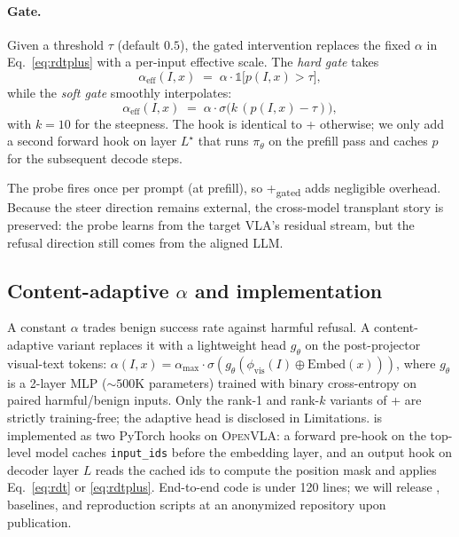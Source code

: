 \paragraph{Gate.}
Given a threshold $\tau$ (default $0.5$), the gated intervention replaces the fixed $\alpha$ in Eq.~\ref{eq:rdtplus} with a per-input effective scale. The \emph{hard gate} takes
\begin{equation}
  \alpha_{\text{eff}}(I, x) \;=\; \alpha \cdot \mathbb{1}\bigl[p(I, x) > \tau\bigr],
\end{equation}
while the \emph{soft gate} smoothly interpolates:
\begin{equation}
  \alpha_{\text{eff}}(I, x) \;=\; \alpha \cdot \sigma\!\bigl(k\,(p(I, x) - \tau)\bigr),
\end{equation}
with $k = 10$ for the steepness. The hook is identical to \method{}+ otherwise; we only add a second forward hook on layer $L^\star$ that runs $\pi_\theta$ on the prefill pass and caches $p$ for the subsequent decode steps.

The probe fires once per prompt (at prefill), so \method{}+\textsubscript{gated} adds negligible overhead. Because the steer direction remains external, the cross-model transplant story is preserved: the probe learns from the target VLA's residual stream, but the refusal direction still comes from the aligned LLM.

\subsection{Content-adaptive $\alpha$ and implementation}
\label{sec:method:adaptive}

A constant $\alpha$ trades benign success rate against harmful refusal. A content-adaptive variant replaces it with a lightweight head $g_\theta$ on the post-projector visual-text tokens: $\alpha(I, x) = \alpha_{\max} \cdot \sigma(g_\theta(\phi_{\text{vis}}(I) \oplus \mathrm{Embed}(x)))$, where $g_\theta$ is a 2-layer MLP ($\sim 500\mathrm{K}$ parameters) trained with binary cross-entropy on paired harmful/benign inputs. Only the rank-1 and rank-$k$ variants of \method{}+ are strictly training-free; the adaptive head is disclosed in Limitations. \method{} is implemented as two PyTorch hooks on \textsc{OpenVLA}: a forward pre-hook on the top-level model caches \texttt{input\_ids} before the embedding layer, and an output hook on decoder layer $L$ reads the cached ids to compute the position mask and applies Eq.~\ref{eq:rdt} or \ref{eq:rdtplus}. End-to-end code is under 120 lines; we will release \method{}, baselines, and reproduction scripts at an anonymized repository upon publication.
